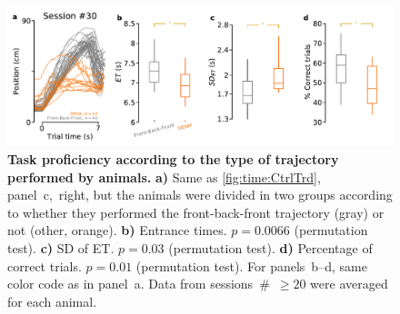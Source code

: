 \begin{figure}[!h]
	\begin{center}
		\includegraphics[width=\textwidth]{ch-appendicies/figures/BadCtrl.pdf}
		\caption[Different Control Trajectory Groups]
		{\textbf{Task proficiency according to the type of trajectory performed by animals.}
		\textbf{a)}
		Same as \autoref{fig:time:CtrlTrd}, panel~c,~right, but the animals were divided in two groups according to whether they performed the front-back-front trajectory (gray) or not (other, orange).
		\textbf{b)}
		Entrance times.
		$p=0.0066$ (permutation test).
		\textbf{c)}
		SD of ET.
		$p=0.03$ (permutation test).
		\textbf{d)}
		Percentage of correct trials.
		$p=0.01$ (permutation test).
		For panels~b--d, same color code as in panel~a.
		Data from sessions~\#~$\geq20$ were averaged for each animal.
		}
		\label{fig:appendix:BadCtrl}
	\end{center}
\end{figure}